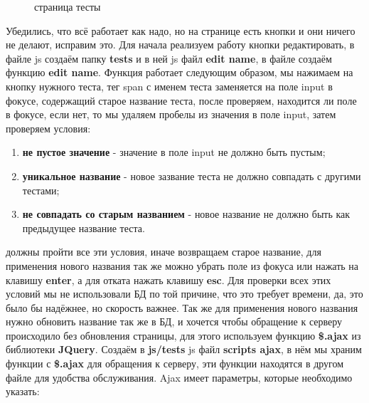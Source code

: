\documentclass[12pt, oldlfont, amsfonts]{report}
\begin{document}
\begin{figure}[h!]
\caption{страница тесты}
\end{figure}

Убедились, что всё работает как надо, но на странице есть кнопки и они ничего не делают, исправим это. Для начала реализуем работу кнопки редактировать, в файле js создаём папку {\bf tests} и в ней js файл {\bf edit name}, в файле создаём функцию {\bf edit name}. Функция работает следующим образом, мы нажимаем на кнопку нужного теста, тег span с именем теста заменяется на поле input в фокусе, содержащий старое название теста, после проверяем, находится ли поле в фокусе, если нет, то мы удаляем пробелы из значения в поле input, затем проверяем условия: 
\begin{enumerate}
\item {\bf не пустое значение} - значение в поле input не должно быть пустым;
\item {\bf уникальное название} - новое зазвание теста не должно совпадать с другими тестами;
\item {\bf не совпадать со старым названием} - новое название не должно быть как предыдущее название теста.
\end{enumerate}

должны пройти все эти условия, иначе возвращаем старое название, для применения нового названия так же можно убрать поле из фокуса или нажать на клавишу {\bf enter}, а для отката нажать клавишу {\bf esc}. Для проверки всех этих условий мы не использовали БД по той причине, что это требует времени, да, это было бы надёжнее, но скорость важнее. Так же для применения нового названия нужно обновить название так же в БД, и хочется чтобы обращение к серверу происходило без обновления страницы, для этого используем функцию  {\bf \$.ajax} из библиотеки {\bf JQuery}. Создаём в {\bf js/tests} js файл {\bf scripts ajax}, в нём мы храним функции с {\bf \$.ajax} для обращения к серверу, эти функции находятся в другом файле для удобства обслуживания. Ajax имеет параметры, которые необходимо указать:
\end{document}
